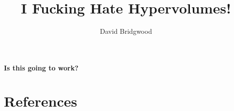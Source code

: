 \documentclass[a4paper,12pt,oneside]{article}
\begin{document}
\title{I Fucking Hate Hypervolumes!}

\author{David Bridgwood}

\maketitle

\preface




\body






\textbf{Is this going to work?}

\clearpage
\section{References}



\clearpage

\end{document}
